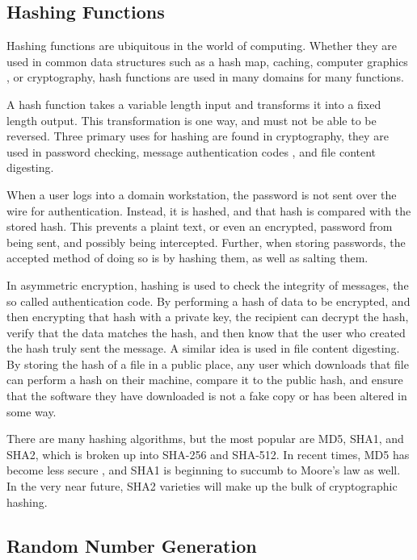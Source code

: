 \documentclass[journal]{IEEEtran}
\begin{document}
\subsection{Hashing Functions}

Hashing functions are ubiquitous in the world of computing.  Whether they are used in common data structures such as a hash map, caching, computer graphics \cite{gpu}, or cryptography, hash functions are used in many domains for many functions.  

A hash function takes a variable length input and transforms it into a fixed length output.  This transformation is one way, and must not be able to be reversed.  Three primary uses for hashing are found in cryptography, they are used in password checking, message authentication codes \cite{hash}, and file content digesting.

When a user logs into a domain workstation, the password is not sent over the wire for authentication.  Instead, it is hashed, and that hash is compared with the stored hash.  This prevents a plaint text, or even an encrypted, password from being sent, and possibly being intercepted.  Further, when storing passwords, the accepted method of doing so is by hashing them, as well as salting them. 

In asymmetric encryption, hashing is used to check the integrity of messages, the so called authentication code.  By performing a hash of data to be encrypted, and then encrypting that hash with a private key, the recipient can decrypt the hash, verify that the data matches the hash, and then know that the user who created the hash truly sent the message.  A similar idea is used in file content digesting.  By storing the hash of a file in a public place, any user which downloads that file can perform a hash on their machine, compare it to the public hash, and ensure that the software they have downloaded is not a fake copy or has been altered in some way.

There are many hashing algorithms, but the most popular are MD5, SHA1, and SHA2, which is broken up into SHA-256 and SHA-512.  In recent times, MD5 has become less secure \cite{hashRainbow} \cite{hashBotnet}, and SHA1 is beginning to succumb to Moore's law as well.  In the very near future, SHA2 varieties will make up the bulk of cryptographic hashing.



\subsection{Random Number Generation}
\end{document}
